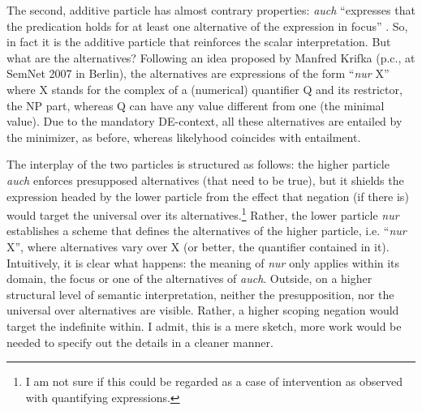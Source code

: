\documentclass[output=paper,colorlinks,citecolor=brown,
]{langscibook}
\begin{document}
The second, additive particle has almost contrary properties: \textit{auch} ``expresses that the
predication holds for at least one alternative of the expression in focus''
\citep[111]{krifka1998a}. So, in fact it is the additive particle that reinforces the scalar
interpretation. But what are the alternatives? Following an idea proposed by Manfred Krifka (p.c.,
at SemNet 2007 in Berlin), the alternatives are expressions of the form ``\textit{nur} X'' where X
stands for the complex of a (numerical) quantifier Q and its restrictor, the NP part, whereas Q can
have any value different from one (the minimal value). Due to the mandatory DE-context, all these
alternatives are entailed by the minimizer, as before, whereas likelyhood coincides with entailment.

The interplay of the two particles is structured as follows: the higher particle \textit{auch} enforces presupposed
alternatives (that need to be true), but it shields the expression headed by the lower particle from the effect that
negation (if there is) would target the universal over its alternatives.\footnote{I am not sure if this could be regarded as a
case of intervention as observed with quantifying expressions.} Rather, the lower particle \textit{nur}
establishes a scheme that defines the alternatives of the higher particle, i.e. ``\textit{nur} X'', where alternatives
vary over X (or better, the quantifier contained in it). Intuitively, it is clear what happens: the meaning of
\textit{nur} only applies within its domain, the focus or one of the alternatives of \textit{auch}. Outside, on a
higher structural level of semantic interpretation, neither the presupposition, nor the universal over alternatives are
visible. Rather, a higher scoping negation would target the indefinite within. I admit, this is a mere sketch, more
work would be needed to specify out the details in a cleaner manner.
\end{document}
